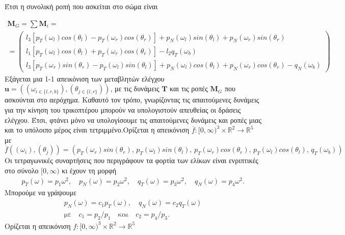 \noindent Έτσι η συνολική ροπή που ασκείται στο σώμα είναι

\begin{gather*}
    \mathbf{M}_G = \sum \mathbf{M}_i = \\
    =\begin{pmatrix}
        {l_3[p_T(\omega_l)cos(\theta_l)- p_T(\omega_r)cos(\theta_r)]
        +p_N(\omega_l)sin(\theta_l) + p_N(\omega_r)sin(\theta_r)} \\[3pt]
        l_1[p_T(\omega_l)cos(\theta_l)+p_T(\omega_r)cos(\theta_r)]
        -l_2 q_T(\omega_b)                                        \\[3pt]
        l_3[p_T(\omega_r)sin(\theta_r)-p_T(\omega_l)sin(\theta_l)]
        +p_N(\omega_l)cos(\theta_l)+p_N(\omega_r)cos(\theta_r)-q_N(\omega_b)
    \end{pmatrix}
\end{gather*}
Εξάγεται μια 1-1 απεικόνιση των μεταβλητών ελέγχου
$\mathbf{u}\! =\! \left(\left(\omega_{i\in \{l, r, b\}}\right),\left(\theta_{j\in \{l, r\}}\right)\right)$, με τις δυνάμεις $\mathbf{T}$ και τις ροπές $\mathbf{M}_G$ που ασκούνται στο αερόχημα. Καθαυτό τον τρόπο, γνωρίζοντας τις απαιτούμενες δυνάμεις για την κίνηση του τρικοπτέρου μπορούν να υπολογιστούν απευθείας  οι δράσεις ελέγχου. Έτσι, φτάνει μόνο να υπολογίσουμε τις απαιτούμενες δυνάμεις και ροπές μιας και το υπόλοιπο μέρος είναι τετριμμένο.Ορίζεται η απεικόνιση
$\overline{f}: [0, \infty)^3\times \mathbb{R}^2\rightarrow \mathbb{R}^5$ με
\begin{equation*}
    \overline{f}
    \left( (\omega_i),(\theta_j) \right) =
    \left(
    p_T(\omega_r)sin(\theta_r),\,
    p_T(\omega_l)sin(\theta_l),\,
    p_T(\omega_r)cos(\theta_r),\,
    p_T(\omega_l)cos(\theta_l),\,
    q_T(\omega_b)
    \right)
\end{equation*}
Οι τετραγωνικές συναρτήσεις που περιγράφουν τα φορτία των ελίκων είναι 
ενριπτικές στο σύνολο $[0,\infty)$ κι έχουν τη μορφή 
\begin{gather*}
    p_T(\omega) = p_1 \omega^2,\quad p_N(\omega) = p_2 \omega^2,\quad
    q_T(\omega) = p_3 \omega^2,\quad q_N(\omega) = p_4 \omega^2.
\end{gather*}
Μπορούμε να γράψουμε
\begin{gather*}
    p_N(\omega) = c_1 p_T(\omega),\quad q_N(\omega) = c_2 q_T(\omega)\\
    \text{με}\quad c_1 = p_2 / p_1\quad \text{και}\quad c_2 = p_4 / p_3.
\end{gather*}
Ορίζεται η απεικόνιση $f:[0, \infty)^3\times \mathbb{R}^2\rightarrow \mathbb{R}^5$
